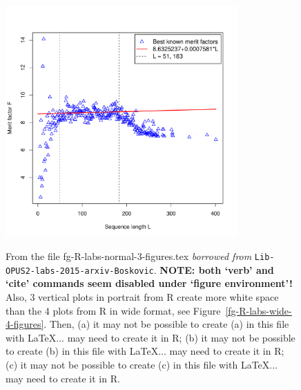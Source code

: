 \begin{figure}[t!]
\vspace*{-5ex}%
\\
\includegraphics[width=0.79\textwidth]{fg-R-labs-wide-4-figures-d}
\vspace*{-5ex}%
%
\caption[From the file fg-R-labs-normal-3-figures.tex]
{From the file fg-R-labs-normal-3-figures.tex {\em borrowed from} {\tt Lib-OPUS2-labs-2015-arxiv-Boskovic}.
{\bf NOTE: both `verb' and `cite' commands seem disabled under `figure environment'!}
Also, 3 vertical plots in portrait from R create more white space than the 4 plots 
from R in wide format, see Figure~\ref{fg-R-labs-wide-4-figures}.
Then,
(a) 
it may not be possible to create (a) in this file with \LaTeX ... may need to create it in R;
%
(b)
it may not be possible to create (b) in this file with \LaTeX ... may need to create it in R;
%
(c)
it may not be possible to create (c) in this file with \LaTeX ... may need to create it in R.
}
\label{fg-R-labs-normal-3-figures}
\end{figure}


